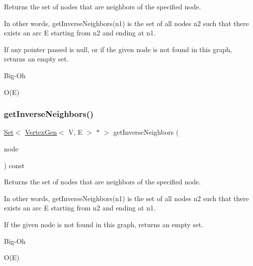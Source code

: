 Returns the set of nodes that are neighbors of the specified node. 

In other words, get\+Inverse\+Neighbors(n1) is the set of all nodes n2 such that there exists an arc E starting from n2 and ending at n1.

If any pointer passed is null, or if the given node is not found in this graph, returns an empty set. \begin{DoxyRefDesc}{Big-\/\+Oh}
\item[\mbox{\hyperlink{BigOh__BigOh000069}{Big-\/\+Oh}}]O(\+E) \end{DoxyRefDesc}
\mbox{\label{classGraph_a5294846b9cdd19394808e3736ec67004}} 
\subsubsection{\texorpdfstring{get\+Inverse\+Neighbors()}{getInverseNeighbors()}\hspace{0.1cm}{\footnotesize\ttfamily [2/2]}}
{\footnotesize\ttfamily \mbox{\hyperlink{classSet}{Set}}$<$ \mbox{\hyperlink{classVertexGen}{Vertex\+Gen}}$<$ V, E $>$  $\ast$ $>$ get\+Inverse\+Neighbors (\begin{DoxyParamCaption}\item[{const std\+::string \&}]{node }\end{DoxyParamCaption}) const\hspace{0.3cm}{\ttfamily [inherited]}}



Returns the set of nodes that are neighbors of the specified node. 

In other words, get\+Inverse\+Neighbors(n1) is the set of all nodes n2 such that there exists an arc E starting from n2 and ending at n1.

If the given node is not found in this graph, returns an empty set. \begin{DoxyRefDesc}{Big-\/\+Oh}
\item[\mbox{\hyperlink{BigOh__BigOh000070}{Big-\/\+Oh}}]O(\+E) \end{DoxyRefDesc}
\mbox{\label{classGraph_ae9b5cbd2bcb3918c4c64b1eb71c1a3a8}} 
